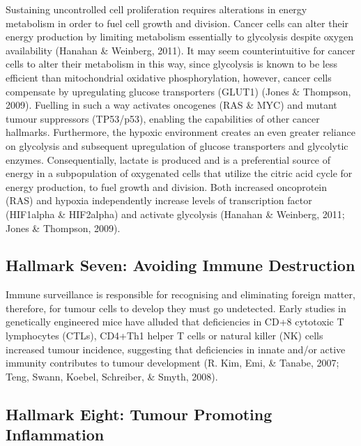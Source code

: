 \documentclass[a4paper, twoside]{templates/ociamthesis}
\begin{document}
Sustaining uncontrolled cell proliferation requires alterations in energy metabolism in order to fuel cell growth and division. Cancer cells can alter their energy production by limiting metabolism essentially to glycolysis despite oxygen availability (Hanahan \& Weinberg, 2011). It may seem counterintuitive for cancer cells to alter their metabolism in this way, since glycolysis is known to be less efficient than mitochondrial oxidative phosphorylation, however, cancer cells compensate by upregulating glucose transporters (GLUT1) (Jones \& Thompson, 2009). Fuelling in such a way activates oncogenes (RAS \& MYC) and mutant tumour suppressors (TP53/p53), enabling the capabilities of other cancer hallmarks. Furthermore, the hypoxic environment creates an even greater reliance on glycolysis and subsequent upregulation of glucose transporters and glycolytic enzymes. Consequentially, lactate is produced and is a preferential source of energy in a subpopulation of oxygenated cells that utilize the citric acid cycle for energy production, to fuel growth and division. Both increased oncoprotein (RAS) and hypoxia independently increase levels of transcription factor (HIF1alpha \& HIF2alpha) and activate glycolysis (Hanahan \& Weinberg, 2011; Jones \& Thompson, 2009).

\hypertarget{hallmark-seven-avoiding-immune-destruction}{%
\subsection{Hallmark Seven: Avoiding Immune Destruction}\label{hallmark-seven-avoiding-immune-destruction}}

Immune surveillance is responsible for recognising and eliminating foreign matter, therefore, for tumour cells to develop they must go undetected. Early studies in genetically engineered mice have alluded that deficiencies in CD+8 cytotoxic T lymphocytes (CTLs), CD4+Th1 helper T cells or natural killer (NK) cells increased tumour incidence, suggesting that deficiencies in innate and/or active immunity contributes to tumour development (R. Kim, Emi, \& Tanabe, 2007; Teng, Swann, Koebel, Schreiber, \& Smyth, 2008).

\hypertarget{hallmark-eight-tumour-promoting-inflammation}{%
\subsection{Hallmark Eight: Tumour Promoting Inflammation}\label{hallmark-eight-tumour-promoting-inflammation}}
\end{document}
